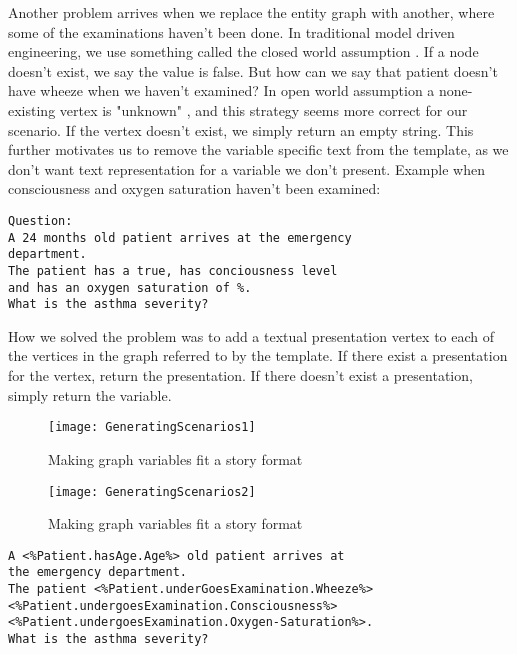 Another problem arrives when we replace the entity graph with another, where some of the examinations haven't been done. In traditional model driven engineering, we use something called the closed world assumption \parencite{Sadowska2019}. If a node doesn't exist, we say the value is false. But how can we say that patient doesn't have wheeze when we haven't examined? In open world assumption a none-existing vertex is "unknown" \parencite{Patel-Schneider2006} \parencite{Bergman2018}, and this strategy seems more correct for our scenario. If the vertex doesn't exist, we simply return an empty string. This further motivates us to remove the variable specific text from the template, as we don't want text representation for a variable we don't present. Example when consciousness and oxygen saturation haven't been examined:

\begin{lstlisting}[caption={Question instantiation}, frame=single, captionpos=b] 
Question:
A 24 months old patient arrives at the emergency 
department. 
The patient has a true, has conciousness level 
and has an oxygen saturation of %. 
What is the asthma severity? 
\end{lstlisting}

How we solved the problem was to add a textual presentation vertex to each of the vertices in the graph referred to by the template. If there exist a presentation for the vertex, return the presentation. If there doesn't exist a presentation, simply return the variable.

\begin{figure}[h!]
	\texttt{[image: GeneratingScenarios1]}
	\caption {Making graph variables fit a story format}
	\label{fig:GeneratingScenarios1}
\end{figure}

\begin{figure}[h!]
	\texttt{[image: GeneratingScenarios2]}
	\caption {Making graph variables fit a story format}
	\label{fig:GeneratingScenarios2}
\end{figure}

\begin{lstlisting}[caption={Question template}, frame=single, captionpos=b] 
A <%Patient.hasAge.Age%> old patient arrives at 
the emergency department. 
The patient <%Patient.underGoesExamination.Wheeze%> 
<%Patient.undergoesExamination.Consciousness%> 
<%Patient.undergoesExamination.Oxygen-Saturation%>. 
What is the asthma severity? 
\end{lstlisting}

